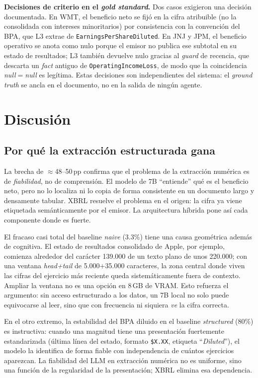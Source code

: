 \documentclass[conference]{IEEEtran}
\begin{document}
\textbf{Decisiones de criterio en el \textit{gold standard}.} Dos casos exigieron
una decisión documentada. En WMT, el beneficio neto se fijó en la cifra
atribuible (no la consolidada con intereses minoritarios) por consistencia con la
convención del BPA, que L3 extrae de \texttt{EarningsPerShareDiluted}. En JNJ y
JPM, el beneficio operativo se anota como nulo porque el emisor no publica ese
subtotal en su estado de resultados; L3 también devuelve nulo gracias al
\textit{guard} de recencia, que descarta un \textit{fact} antiguo de
\texttt{OperatingIncomeLoss}, de modo que la coincidencia
\textit{null}$=$\textit{null} es legítima. Estas decisiones son independientes
del sistema: el \textit{ground truth} se ancla en el documento, no en la salida
de ningún agente.

\section{Discusión}
\label{sec:discussion}
\subsection{Por qué la extracción estructurada gana}
La brecha de $\approx$48--50\,pp confirma que el problema de la extracción
numérica es de \emph{fiabilidad}, no de comprensión. El modelo de 7B
``entiende'' qué es el beneficio neto, pero no lo localiza ni lo copia de forma
consistente en un documento largo y densamente tabular. XBRL resuelve el problema
en el origen: la cifra ya viene etiquetada semánticamente por el emisor. La
arquitectura híbrida pone así cada componente donde es fuerte.

El fracaso casi total del baseline \textit{naive} (3.3\%) tiene una causa
geométrica además de cognitiva. El estado de resultados consolidado de Apple, por
ejemplo, comienza alrededor del carácter 139.000 de un texto plano de unos
220.000; con una ventana \textit{head+tail} de 5.000$+$35.000 caracteres, la zona
central donde viven las cifras del ejercicio más reciente queda sistemáticamente
fuera de contexto. Ampliar la ventana no es una opción en 8\,GB de VRAM. Esto
refuerza el argumento: sin acceso estructurado a los datos, un 7B local no solo
puede equivocarse al leer, sino que con frecuencia ni siquiera \emph{ve} la cifra
correcta.

En el otro extremo, la estabilidad del BPA diluido en el baseline
\textit{structured} (80\%) es instructiva: cuando una magnitud tiene una
presentación fuertemente estandarizada (última línea del estado, formato
\texttt{\$X.XX}, etiqueta ``\textit{Diluted}''), el modelo la identifica de forma
fiable con independencia de cuántos ejercicios aparezcan. La fiabilidad del LLM en
extracción numérica no es uniforme, sino una función de la regularidad de la
presentación; XBRL elimina esa dependencia.
\end{document}
